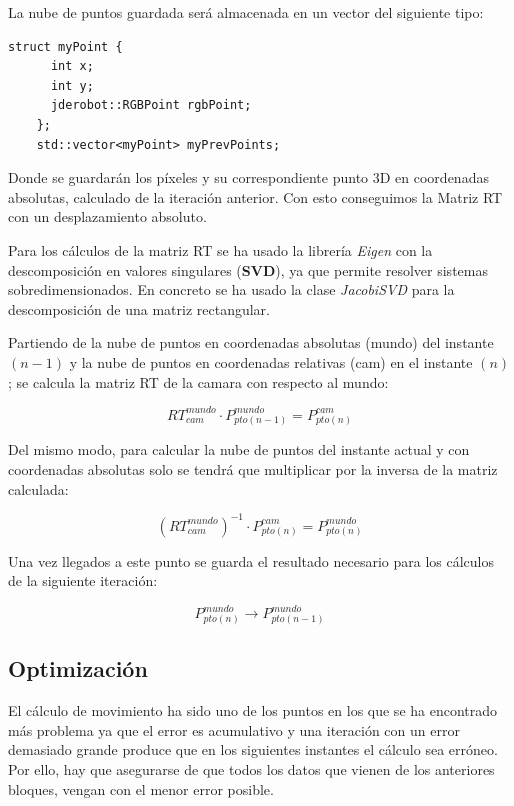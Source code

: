 La nube de puntos guardada será almacenada en un vector del siguiente tipo:

\begin{lstlisting}[style=CStyle]
    struct myPoint {
      int x;
      int y;
      jderobot::RGBPoint rgbPoint;
    };
    std::vector<myPoint> myPrevPoints;
\end{lstlisting}

Donde se guardarán los píxeles y su correspondiente punto 3D en coordenadas absolutas, calculado de la iteración anterior. Con esto conseguimos la Matriz RT con un desplazamiento absoluto.

Para los cálculos de la matriz RT se ha usado la librería \textit{Eigen} con la descomposición en valores singulares (\textbf{SVD}), ya que permite resolver sistemas sobredimensionados. En concreto se ha usado la clase \textit{JacobiSVD} para la descomposición de una matriz rectangular.

Partiendo de la nube de puntos en coordenadas absolutas (mundo) del instante $(n-1)$ y la nube de puntos en coordenadas relativas (cam) en el instante $(n)$; se calcula la matriz RT de la camara con respecto al mundo:

\begin{equation}
RT_{cam}^{mundo}\cdot P_{pto(n-1)}^{mundo}=P_{pto(n)}^{cam}
\end{equation}

Del mismo modo, para calcular la nube de puntos del instante actual y con coordenadas absolutas solo se tendrá que multiplicar por la inversa de la matriz calculada:

\begin{equation}
\left(RT_{cam}^{mundo}\right)^{-1}\cdot P_{pto(n)}^{cam}=P_{pto(n)}^{mundo}
\end{equation}

Una vez llegados a este punto se guarda el resultado necesario para los cálculos de la siguiente iteración:

\begin{equation}
P_{pto(n)}^{mundo}\longrightarrow P_{pto(n-1)}^{mundo}
\end{equation}

\subsection{Optimización}

El cálculo de movimiento ha sido uno de los puntos en los que se ha encontrado más problema ya que el error es acumulativo y una iteración con un error demasiado grande produce que en los siguientes instantes el cálculo sea erróneo. Por ello, hay que asegurarse de que todos los datos que vienen de los anteriores bloques, vengan con el menor error posible.


